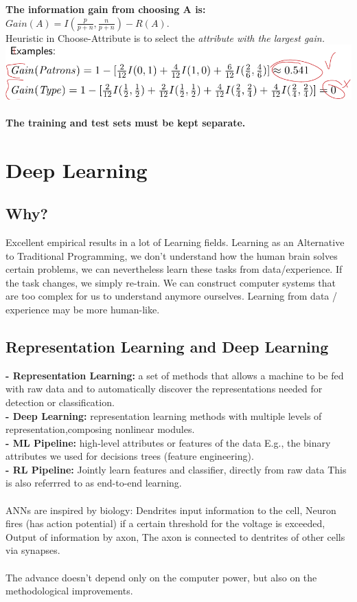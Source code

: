 \documentclass{article}
\begin{document}
\textbf{The information gain from choosing A is: }$Gain(A) = I(\frac{p}{p+n},\frac{n}{p+n})-R(A)$.\\
Heuristic in Choose-Attribute is to select the \textit{attribute with the largest gain.}\\
\includegraphics[scale=0.3]{91.png}\\\\
\textbf{The training and test sets must be kept separate.}\\

\section{Deep Learning}
\subsection{Why?}
Excellent empirical results in a lot of Learning fields. Learning as an Alternative to Traditional Programming, we don’t understand how the human brain solves certain problems, we can nevertheless learn these tasks from data/experience. If the task changes, we simply re-train. We can construct computer systems that are too complex for us to understand anymore ourselves. Learning from data / experience may be more human-like.
\subsection{Representation Learning and Deep Learning}
\textbf{- Representation Learning: }a set of methods that allows a machine to be fed with raw data and to automatically discover the representations needed for detection or classification.\\
\textbf{- Deep Learning: }representation learning methods with multiple levels of representation,composing nonlinear modules.\\
\textbf{- ML Pipeline: }high-level attributes or features of the data E.g., the binary attributes we used for decisions trees (feature engineering).\\
\textbf{- RL Pipeline: }Jointly learn features and classifier, directly from raw data
This is also referrred to as end-to-end learning.\\\\
ANNs are inspired by biology: Dendrites input information to the cell, Neuron fires (has action potential) if a certain threshold for the voltage is exceeded, Output of information by axon, The axon is connected to dentrites of other cells via synapses.\\\\
The advance doesn’t depend only on the computer power, but also on the methodological improvements.
\end{document}
